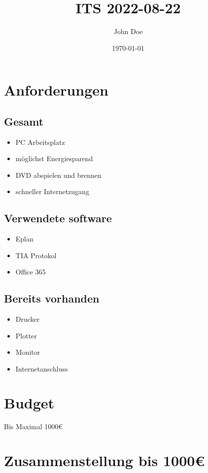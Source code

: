 \documentclass[11pt]{article}
\author{John Doe}
\date{\today}
\title{ITS 2022-08-22}
\begin{document}
\maketitle
\tableofcontents

\section{Anforderungen}
\label{sec:org7d578da}
\subsection{Gesamt}
\label{sec:org2cf942e}
\begin{itemize}
\item PC Arbeitsplatz
\item möglichst Energiesparend
\item DVD abspielen und brennen
\item schneller Internetzugang
\end{itemize}

\subsection{Verwendete software}
\label{sec:orgb702fcc}
\begin{itemize}
\item Eplan
\item TIA Protokol
\item Office 365
\end{itemize}

\subsection{Bereits vorhanden}
\label{sec:org9922804}
\begin{itemize}
\item Drucker
\item Plotter
\item Monitor
\item Internetanschluss
\end{itemize}









\section{Budget}
\label{sec:org6183802}
Bis Maximal 1000€
\section{Zusammenstellung bis 1000€}
\label{sec:org8f31425}
\end{document}
